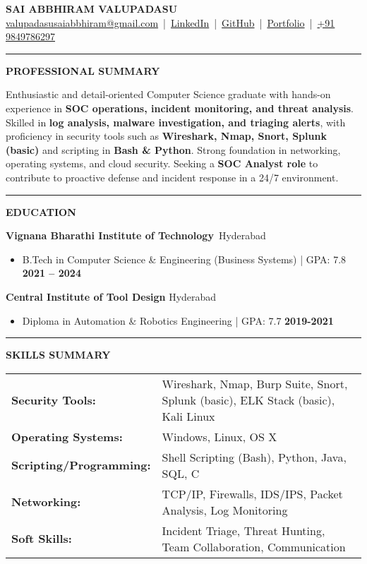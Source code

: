 \documentclass[11pt,a4paper]{article}
\newcommand{\resumesection}[1]{
	\vspace{0.2cm}
	\hrule
	\vspace{0.2cm}
	\centerline{\large\textbf{#1}}
	\vspace{0.15cm}
}
\begin{document}
	
	
	\noindent
	\begin{center}
		\textbf{\Huge SAI ABBHIRAM VALUPADASU} \\[0.3em]
		\href{mailto:valupadasusaiabbhiram@gmail.com}{valupadasusaiabbhiram@gmail.com} \,|\, 
		\href{https://www.linkedin.com/in/sai-abbhiram-valupadasu/}{LinkedIn} \,|\, 
		\href{https://github.com/ValupadasuSaiAbbhiram}{GitHub} \,|\, 
		\href{https://saiabbhiram-portfolio.vercel.app}{Portfolio} \,|\,
		\href{tel:+919849786297}{+91 9849786297}
	\end{center}
	
	
	\resumesection{PROFESSIONAL SUMMARY}
	\noindent
	Enthusiastic and detail-oriented Computer Science graduate with hands-on experience in \textbf{SOC operations, incident monitoring, and threat analysis}. Skilled in \textbf{log analysis, malware investigation, and triaging alerts}, with proficiency in security tools such as \textbf{Wireshark, Nmap, Snort, Splunk (basic)} and scripting in \textbf{Bash \& Python}. Strong foundation in networking, operating systems, and cloud security. Seeking a \textbf{SOC Analyst role} to contribute to proactive defense and incident response in a 24/7 environment.
	
	
	\resumesection{EDUCATION}
	\noindent \textbf{Vignana Bharathi Institute of Technology}\ \hfill Hyderabad
	\begin{itemize}
		\item B.Tech in Computer Science \& Engineering (Business Systems) | GPA: 7.8 \textbf{\hfill 2021 -- 2024}
	\end{itemize}
	
	\noindent \textbf{Central Institute of Tool Design} \hfill Hyderabad
	\begin{itemize}
		\item Diploma in Automation \& Robotics Engineering | GPA: 7.7 \textbf{\hfill 2019-2021}
	\end{itemize}
	
	
	\resumesection{SKILLS SUMMARY}
	\noindent \begin{tabularx}{\textwidth}{@{}lX@{}}
		\textbf{Security Tools:} & Wireshark, Nmap, Burp Suite, Snort, Splunk (basic), ELK Stack (basic), Kali Linux \\
		\textbf{Operating Systems:} & Windows, Linux, OS X \\
		\textbf{Scripting/Programming:} & Shell Scripting (Bash), Python, Java, SQL, C \\
		\textbf{Networking:} & TCP/IP, Firewalls, IDS/IPS, Packet Analysis, Log Monitoring \\
		\textbf{Soft Skills:} & Incident Triage, Threat Hunting, Team Collaboration, Communication \\
	\end{tabularx}
	
\end{document}
